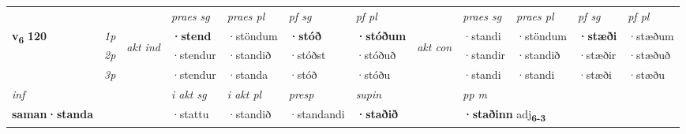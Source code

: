 \begin{longtable}[l]{X>{\footnotesize\itshape}llXXXXlXXXX}
\midrule

 & &   & \textit{praes sg}  & \textit{praes pl}    & \textit{ pf sg} & \textit{pf pl} & & \textit{praes sg}  & \textit{praes pl}    & \textit{pf sg} & \textit{pf pl }  \\ \cmidrule{4-7} \cmidrule{9-12}
 \multirow{2}{*}{{{\textbf{v{\textsubscript{6}}} \Large{\textbf{120}}}}}  & 1p & \multirow{3}{*}{\begin{turn}{90}\textit{akt ind}\end{turn}} & \textbf{·stend} & ·stöndum & \textbf{·stóð} & \textbf{·stóðum} & \multirow{3}{*}{\begin{turn}{90}\textit{akt con}\end{turn}} &·standi & ·stöndum & \textbf{·stæði} & ·stæðum\\*
 & 2p &  &  ·stendur  & ·standið & ·stóðst & ·stóðuð & & ·standir & ·standið & ·stæðir & ·stæðuð \\*
 & 3p &  & ·stendur & ·standa & ·stóð & ·stóðu & & ·standi & ·standi& ·stæði & ·stæðu \\*
\cmidrule{4-7} \cmidrule{9-12}

   {\textit{inf}} & &  & \textit{i akt sg} & \textit{i akt pl}   & \textit{presp} & \textit{supin}  && \textit{pp m} \\*
  {\textbf{saman\allowbreak ·standa}} & && ·stattu  & ·standið   & ·standandi &  \textbf{·staðið}  && \multicolumn{2}{l}{\textbf{·staðinn} adj\textbf{\textsubscript{6-3}}} \\*

\midrule


\end{longtable}
